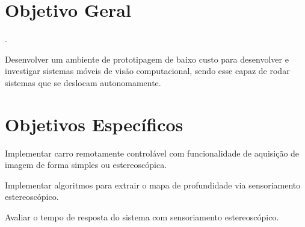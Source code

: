 \section{Objetivo Geral}.

Desenvolver um ambiente de prototipagem de baixo custo para desenvolver e investigar sistemas móveis de visão computacional, sendo esse capaz de rodar sistemas que se deslocam autonomamente. 

\section{Objetivos Específicos}

\begin{alineas}
    \item Implementar carro remotamente controlável com funcionalidade de aquisição de imagem de forma simples ou estereoscópica.
    \item Implementar algoritmos para extrair o mapa de profundidade via sensoriamento estereoscópico.
    \item Avaliar o tempo de resposta do sistema com sensoriamento estereoscópico.
\end{alineas}

